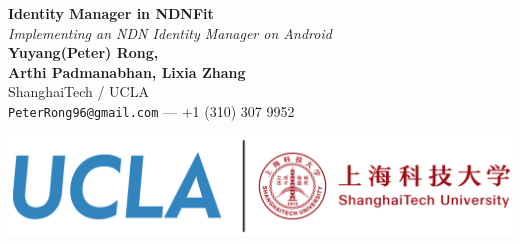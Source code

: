 \documentclass[a0,portrait]{poster}
\begin{document}


\begin{minipage}[b]{0.6\linewidth}
\veryHuge \color{NavyBlue} \textbf{Identity Manager in NDNFit} \color{Black}\\ %
\Huge\textit{Implementing an NDN Identity Manager on Android}\\[2cm] %
\Large \textbf{Yuyang(Peter) Rong, \\ Arthi Padmanabhan, Lixia Zhang \footnotemark}\\[0.5cm] %
\Large ShanghaiTech / UCLA \\ [0.4cm] %
\Large \texttt{PeterRong96@gmail.com} --- +1 (310) 307 9952\\
\end{minipage}
%
\begin{minipage}[b]{0.4\linewidth}
	\includegraphics[width=\linewidth]{figures/logo.png}\\
\end{minipage}

\vspace{0.7cm} %

\end{document}

